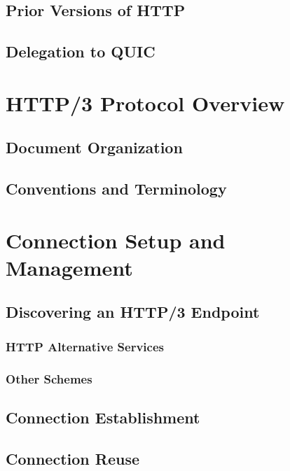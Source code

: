 \documentclass{article}
\begin{document}
\subsection{Prior Versions of HTTP}

\subsection{Delegation to QUIC}

\section{HTTP/3 Protocol Overview}

\subsection{Document Organization}

\subsection{Conventions and Terminology}

\section{Connection Setup and Management}

\subsection{Discovering an HTTP/3 Endpoint}

\subsubsection{HTTP Alternative Services}

\subsubsection{Other Schemes}

\subsection{Connection Establishment}

\subsection{Connection Reuse}
\end{document}
